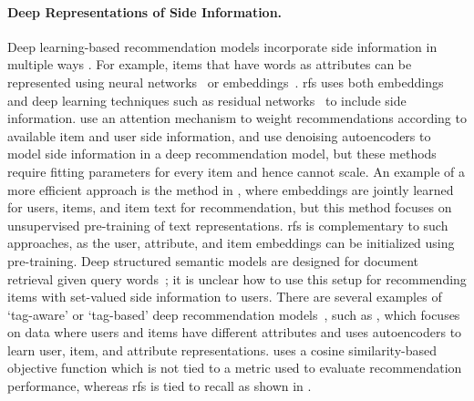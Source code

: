 \paragraph{Deep Representations of Side Information.} Deep learning-based recommendation models incorporate side information in multiple ways \citep{zhang2017deep}. For example, items that have words as attributes can be represented using neural networks~\citep{bansal2016ask-the-gru:,chen2018a-collective} or embeddings~\citep{wu2018starspace:}. \gls{rfs} uses both embeddings and deep learning techniques such as residual networks~\citep{he2015deep} to include side information. \citet{lian2018towards} use an attention mechanism to weight recommendations according to available item and user side information, and \citet{dong2017a-hybrid} use denoising autoencoders to model side information in a deep recommendation model, but these methods require fitting parameters for every item and hence cannot scale. An example of a more efficient approach is the method in \citet{chen2017joint}, where embeddings are jointly learned for users, items, and item text for recommendation, but this method focuses on unsupervised pre-training of text representations. \gls{rfs} is complementary to such approaches, as the user, attribute, and item embeddings can be initialized using pre-training. Deep structured semantic models are designed for document retrieval given query words~\citep{huang2013learning,palangi2016deep}; it is unclear how to use this setup for recommending items with set-valued side information to users. There are several examples of `tag-aware' or `tag-based' deep recommendation models~\citep{liang2018trsdl:,zuo2016tag-aware}, such as \citet{xu2017tag-aware}, which focuses on data where users and items have different attributes and uses autoencoders to learn user, item, and attribute representations. \citet{xu2017tag-aware} uses a cosine similarity-based objective function which is not tied to a metric used to evaluate recommendation performance, whereas \gls{rfs} is tied to recall as shown in .

